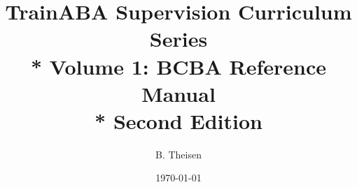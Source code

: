 \documentclass[14pt]{book}
\title{TrainABA Supervision Curriculum Series\\* Volume 1: BCBA Reference Manual \\* Second Edition}
\author{B. Theisen}
\date{\today}
\begin{document}
     \maketitle
     \tableofcontents
     \listoffigures
     \listoftables
% 
 
 
% 
	\nocite{*}	
	
	\printbibliography   
	\printindex
\end{document}
